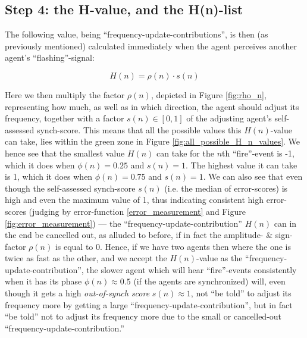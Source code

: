 \subsection{Step 4: the H-value, and the H(n)-list}
\label{H_n}

The following value, being ``frequency-update-contributions'', is then (as previously mentioned) calculated immediately when the agent perceives another agent's ``flashing''-signal:

\begin{equation}
\label{h_value}
	H(n) = \rho(n) \cdot s(n)
\end{equation}

Here we then multiply the factor $\rho(n)$, depicted in Figure \ref{fig:rho_n}, representing how much, as well as in which direction, the agent should adjust its frequency, together with a factor $s(n) \in [0,1]$ of the adjusting agent's self-assessed synch-score. This means that all the possible values this $H(n)$-value can take, lies within the green zone in Figure \ref{fig:all_possible_H_n_values}. We hence see that the smallest value $H(n)$ can take for the $n$th ``fire''-event is -1, which it does when $\phi(n) = 0.25$ and $s(n) = 1$. The highest value it can take is 1, which it does when $\phi(n) = 0.75$ and $s(n) = 1$. We can also see that even though the self-assessed synch-score $s(n)$ (i.e. the median of error-scores) is high and even the maximum value of 1, thus indicating consistent high error-scores (judging by error-function \eqref{error_measurement} and Figure \ref{fig:error_measurement}) — the ``frequency-update-contribution'' $H(n)$ can in the end be cancelled out, as alluded to before, if in fact the amplitude- \& sign-factor $\rho(n)$ is equal to 0. Hence, if we have two agents then where the one is twice as fast as the other, and we accept the $H(n)$-value as the ``frequency-update-contribution'', the slower agent which will hear ``fire''-events consistently when it has its phase $\phi(n) \approx 0.5$ (if the agents are synchronized) will, even though it gets a high \textit{out-of-synch score} $s(n) \approx 1$, not ``be told'' to adjust its frequency more by getting a large ``frequency-update-contribution'', but in fact ``be told'' not to adjust its frequency more due to the small or cancelled-out ``frequency-update-contribution.''

